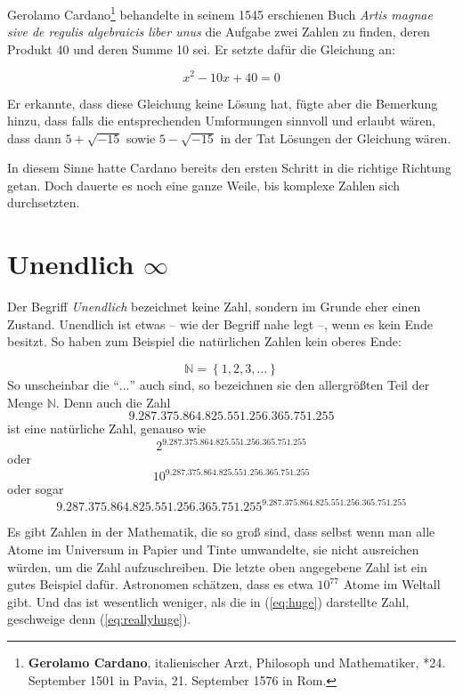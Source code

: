 Gerolamo Cardano\footnote{\textbf{Gerolamo Cardano}, italienischer Arzt, Philosoph und Mathematiker, *24. September 1501 in Pavia, 21. September 1576 in Rom.} behandelte in seinem 1545 erschienen Buch \textit{Artis magnae sive de regulis algebraicis liber unus} die Aufgabe zwei Zahlen zu finden, deren Produkt 40 und deren Summe 10 sei. Er setzte dafür die Gleichung an:

\[ x^2-10x+40=0 \]

Er erkannte, dass diese Gleichung keine Lösung hat, fügte aber die Bemerkung hinzu, dass falls die entsprechenden Umformungen sinnvoll und erlaubt wären, dass dann $5+\sqrt{-15}$ sowie $5-\sqrt{-15} $ in der Tat Lösungen der Gleichung wären. 

In diesem Sinne hatte Cardano bereits den ersten Schritt in die richtige Richtung getan. Doch dauerte es noch eine ganze Weile, bis komplexe Zahlen sich durchsetzten.


\section{Unendlich $\infty$}\label{sec:infty}

Der Begriff \emph{Unendlich} bezeichnet keine Zahl, sondern im Grunde eher einen Zustand. Unendlich ist etwas -- wie der Begriff nahe legt --, wenn es kein Ende besitzt. So haben zum Beispiel die natürlichen Zahlen kein oberes Ende:

\[
\mathbb{N} = \left\lbrace 1,2,3, \dots \right\rbrace
\]
So unscheinbar die "`$\dots$"' auch sind, so bezeichnen sie den allergrößten Teil der Menge $\mathbb{N}$. Denn auch die Zahl 
\[9.287.375.864.825.551.256.365.751.255\]
ist eine natürliche Zahl, genauso wie 
\[2^{9.287.375.864.825.551.256.365.751.255}\]
oder
\begin{equation} \label{eq:huge}
10^{9.287.375.864.825.551.256.365.751.255}
\end{equation}
oder sogar
\begin{equation}\label{eq:reallyhuge}
9.287.375.864.825.551.256.365.751.255^{9.287.375.864.825.551.256.365.751.255}
\end{equation}

Es gibt Zahlen in der Mathematik, die so groß sind, dass selbst wenn man alle Atome im Universum in Papier und Tinte umwandelte, sie nicht ausreichen würden, um die Zahl aufzuschreiben. Die letzte oben angegebene Zahl ist ein gutes Beispiel dafür. Astronomen schätzen, dass es etwa $10^{77}$ Atome im Weltall gibt. Und das ist wesentlich weniger, als die in (\ref{eq:huge}) darstellte Zahl, geschweige denn (\ref{eq:reallyhuge}).

